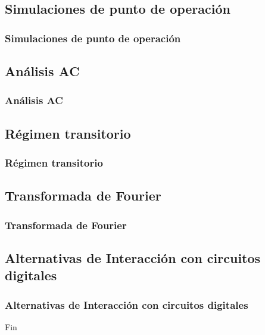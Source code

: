 \documentclass{beamer}
\begin{document}
\subsection{Simulaciones de punto de operación}
\begin{frame}
\frametitle{Simulaciones de punto de operación}
\end{frame}
\subsection{Análisis AC}
\begin{frame}
\frametitle{Análisis AC}
\end{frame}
\subsection{Régimen transitorio}
\begin{frame}
\frametitle{Régimen transitorio}
\end{frame}
\subsection{Transformada de Fourier}
\begin{frame}
\frametitle{Transformada de Fourier}
\end{frame}
\subsection{Alternativas de Interacción con circuitos digitales}
\begin{frame}
\frametitle{Alternativas de Interacción con circuitos digitales}
\end{frame}

\begin{frame}
\Huge{\centerline{Fin}}
\end{frame}

\end{document}
